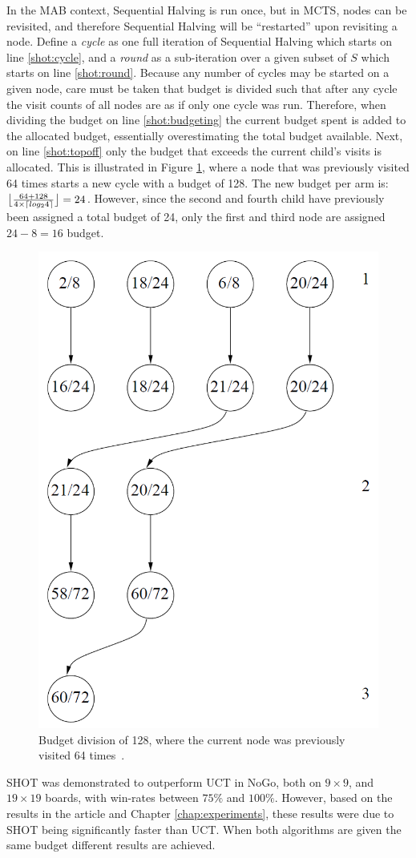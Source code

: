 \documentclass{kecsmstr}
\DeclarePairedDelimiter{\ceil}{\lceil}{\rceil}
\DeclarePairedDelimiter{\floor}{\lfloor}{\rfloor}
\begin{document}
In the MAB context, Sequential Halving is run once, but in MCTS, nodes can be revisited, and therefore Sequential Halving will be ``restarted'' upon revisiting a node. Define a \emph{cycle} as one full iteration of Sequential Halving which starts on line \ref{shot:cycle}, and a \emph{round} as a sub-iteration over a given subset of $S$ which starts on line \ref{shot:round}. Because any number of cycles may be started on a given node, care must be taken that budget is divided such that after any cycle the visit counts of all nodes are as if only one cycle was run. Therefore, when dividing the budget on line \ref{shot:budgeting} the current budget spent is added to the allocated budget, essentially overestimating the total budget available. Next, on line \ref{shot:topoff} only the budget that exceeds the current child's visits is allocated. This is illustrated in Figure \ref{fig:shot-topoffs}, where a node that was previously visited 64 times starts a new cycle with a budget of 128. The new budget per arm is: $\floor[\big]{\frac{64 + 128}{4\times\ceil{log_2{4}}}} = 24$. However, since the second and fourth child have previously been assigned a total budget of 24, only the first and third node are assigned $24-8=16$ budget.

\begin{figure}[h]
	\centering
	\includegraphics[width=.5\textwidth]{img/shot_topoffs.png}
	\caption{Budget division of 128, where the current node was previously visited 64 times~\protect{}.}
	\label{fig:shot-topoffs}
\end{figure}

SHOT was demonstrated to outperform UCT in NoGo, both on $9\times9$, and $19\times19$ boards, with win-rates between $75\%$ and $100\%$. However, based on the results in the article and Chapter \ref{chap:experiments}, these results were due to SHOT being significantly faster than UCT. When both algorithms are given the same budget different results are achieved.
\end{document}
